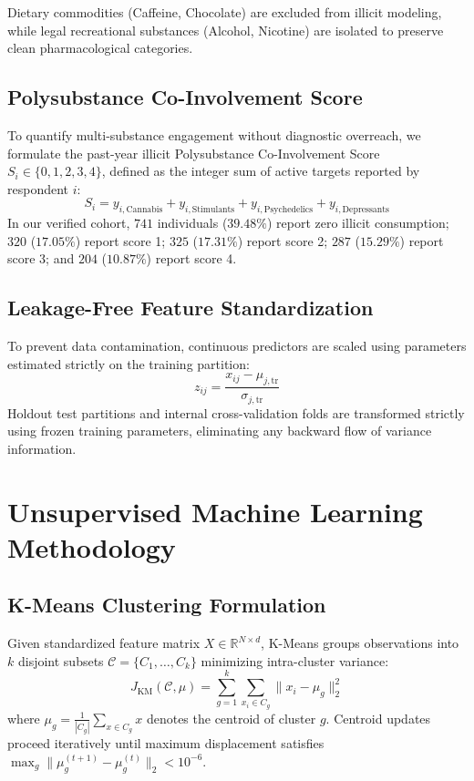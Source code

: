 \documentclass[conference]{IEEEtran}
\begin{document}
Dietary commodities (Caffeine, Chocolate) are excluded from illicit modeling, while legal recreational substances (Alcohol, Nicotine) are isolated to preserve clean pharmacological categories.

\subsection{Polysubstance Co-Involvement Score}
To quantify multi-substance engagement without diagnostic overreach, we formulate the past-year illicit Polysubstance Co-Involvement Score $S_i \in \{0, 1, 2, 3, 4\}$, defined as the integer sum of active targets reported by respondent $i$:
\begin{equation}
S_i = y_{i, \text{Cannabis}} + y_{i, \text{Stimulants}} + y_{i, \text{Psychedelics}} + y_{i, \text{Depressants}}
\end{equation}
In our verified cohort, $741$ individuals ($39.48\%$) report zero illicit consumption; $320$ ($17.05\%$) report score 1; $325$ ($17.31\%$) report score 2; $287$ ($15.29\%$) report score 3; and $204$ ($10.87\%$) report score 4.

\subsection{Leakage-Free Feature Standardization}
To prevent data contamination, continuous predictors are scaled using parameters estimated strictly on the training partition:
\begin{equation}
z_{ij} = \frac{x_{ij} - \mu_{j, \text{tr}}}{\sigma_{j, \text{tr}}}
\end{equation}
Holdout test partitions and internal cross-validation folds are transformed strictly using frozen training parameters, eliminating any backward flow of variance information.

\section{Unsupervised Machine Learning Methodology}

\subsection{K-Means Clustering Formulation}
Given standardized feature matrix $X \in \mathbb{R}^{N \times d}$, K-Means groups observations into $k$ disjoint subsets $\mathcal{C} = \{C_1, \dots, C_k\}$ minimizing intra-cluster variance:
\begin{equation}
J_{\text{KM}}(\mathcal{C}, \mu) = \sum_{g=1}^k \sum_{x_i \in C_g} \|x_i - \mu_g\|_2^2
\end{equation}
where $\mu_g = \frac{1}{|C_g|} \sum_{x \in C_g} x$ denotes the centroid of cluster $g$. Centroid updates proceed iteratively until maximum displacement satisfies $\max_g \|\mu_g^{(t+1)} - \mu_g^{(t)}\|_2 < 10^{-6}$.
\end{document}
